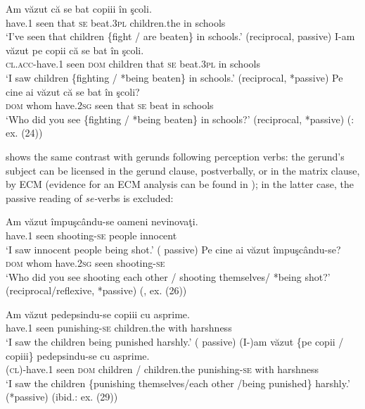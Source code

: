 \documentclass[output=paper]{langsci/langscibook}
\begin{document}
\ea%
    \label{ex:giurgea:62}
\ea
    \gll Am     văzut că   se bat          copiii           în şcoli.\\
          have.\textsc{1} seen that \textsc{se} beat.\textsc{3pl} children.the in schools\\
    \glt ‘I’ve seen that children \{fight / are beaten\} in schools.’ (reciprocal, passive)
\ex
    \gll  I-am              văzut pe    copii      că   se  bat         în şcoli.\\
          \textsc{cl.acc-}have.\textsc{1} seen  \textsc{dom} children that \textsc{se} beat.\textsc{3pl} in schools\\
    \glt  ‘I saw children \{fighting / *being beaten\} in schools.’ (reciprocal, *passive)
\ex
    \gll Pe    cine     ai            văzut că   se bat  în şcoli?\\
         \textsc{dom} whom have.\textsc{2sg} seen that \textsc{se} beat in schools\\
    \glt ‘Who did you see \{fighting / *being beaten\} in schools?’ (reciprocal, *passive) (\citealt{Cornilescu1998}: ex. (24))   
\z
\z

 shows the same contrast with gerunds following perception verbs: the gerund’s subject can be licensed in the gerund clause, postverbally, or in the matrix clause, by ECM (evidence for an ECM analysis can be found in \citealt{Avram2003}); in the latter case, the passive reading of \textit{se-}verbs is excluded:

\ea%
    \label{ex:giurgea:63}
    \ea
    \gll Am    văzut împuşcându-se oameni nevinovaţi. \\
          have.\textsc{1} seen   shooting-\textsc{se}      people  innocent\\
    \glt ‘I saw innocent people being shot.’ ( passive)
    \ex
    \gll Pe     cine      ai          văzut împuşcându-se? \\
         \textsc{dom} whom have.\textsc{2sg} seen  shooting-\textsc{se}\\
    \glt ‘Who did you see shooting each other / shooting themselves/ *being shot?’ (reciprocal\slash reflexive, *passive) (\citealt{Cornilescu1998}, ex. (26))
    \z
\z

\ea%
    \label{ex:giurgea:64}
\ea
    \gll Am     văzut pedepsindu-se copiii            cu     asprime.   \\
         have.\textsc{1} seen   punishing-\textsc{se}    children.the with harshness\\
    \glt ‘I saw the children being punished harshly.’ ( passive)
\ex
    \gll (I-)am       văzut \{pe     copii   / copiii\}         pedepsindu-se cu     asprime.   \\
          (\textsc{cl})-have.\textsc{1} seen \textsc{dom} children / children.the punishing-\textsc{se}   with harshness\\
    \glt ‘I saw the children \{punishing themselves\slash each other \slash *being punished\} harshly.’ (*passive) (ibid.: ex. (29))
    \z
\z    
\end{document}
